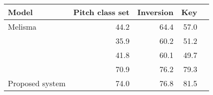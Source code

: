 \begin{tabular}{l|rrrr}
Model                        & Pitch class set & Inversion & Key  \\
\hline                       
Melisma                      & 44.2            & 64.4      & 57.0 \\
\textcite{mcleod2021modular} & 35.9            & 60.2      & 51.2 \\
\textcite{chen2021attend}    & 41.8            & 60.1      & 49.7 \\
\textcite{micchi2021deep}    & 70.9            & 76.2      & 79.3 \\
Proposed system              & 74.0            & 76.8      & 81.5
\end{tabular}

               
